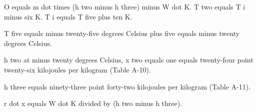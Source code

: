 O equals m dot times (h two minus h three) minus W dot K.  
T two equals T i minus six K.  
T i equals T five plus ten K.  

T five equals minus twenty-five degrees Celsius plus five equals minus twenty degrees Celsius.  

h two at minus twenty degrees Celsius, x two equals one equals twenty-four point twenty-six kilojoules per kilogram (Table A-10).  

h three equals ninety-three point forty-two kilojoules per kilogram (Table A-11).  

r dot x equals W dot K divided by (h two minus h three).